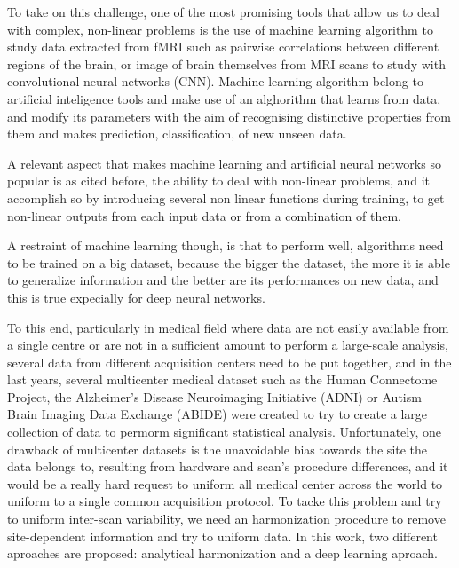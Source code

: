 \documentclass[12pt]{report}
\begin{document}
To take on this challenge, one of the most promising tools that allow us to deal with complex, non-linear problems is the use of machine learning algorithm to study data extracted from fMRI such as pairwise correlations between different regions of the brain, or image of brain themselves from MRI scans to study with convolutional neural networks (CNN).
Machine learning algorithm belong to artificial inteligence tools and make use of an alghorithm that learns from data, and modify its parameters with the aim of recognising distinctive properties from them and makes prediction, classification, of new unseen data.

A relevant aspect that makes machine learning and artificial neural networks so popular is as cited before, the ability to deal with non-linear problems, and it accomplish so by introducing several non linear functions during training, to get non-linear outputs from each input data or from a combination of them.

A restraint of machine learning though, is that to perform well, algorithms need to be trained on a big dataset, because the bigger the dataset, the more it is able to generalize information and the better are its performances on new data, and this is true expecially for deep neural networks.

To this end, particularly in medical field where data are not easily available from a single centre or are not in a sufficient amount to perform a large-scale analysis, several data from different acquisition centers need to be put together, and in the last years, several multicenter medical dataset such as the Human Connectome Project, the Alzheimer’s Disease Neuroimaging Initiative (ADNI) or Autism Brain Imaging Data Exchange (ABIDE) were created to try to create a large collection of data to permorm significant statistical analysis.
Unfortunately, one drawback of multicenter datasets is the unavoidable bias towards the site the data belongs to, resulting from hardware and scan's procedure differences, and it would be a really hard request to uniform all medical center across the world to uniform to a single common acquisition protocol.
To tacke this problem and try to uniform inter-scan variability, we need an harmonization procedure to remove site-dependent information and try to uniform data.
In this work, two different aproaches are proposed: analytical harmonization and a deep learning aproach.
\end{document}
